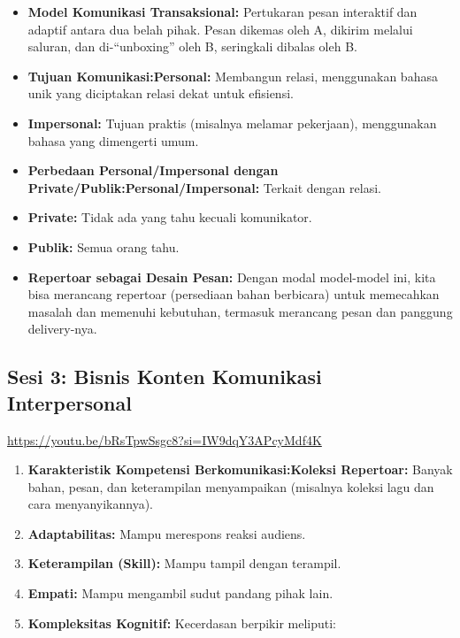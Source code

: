 \documentclass[
  letterpaper,
  DIV=11,
  numbers=noendperiod]{scrreprt}
\providecommand{\tightlist}{%
  \setlength{\itemsep}{0pt}\setlength{\parskip}{0pt}}
\begin{document}
\begin{itemize}
\tightlist
\item
  \textbf{Model Komunikasi Transaksional:} Pertukaran pesan interaktif
  dan adaptif antara dua belah pihak. Pesan dikemas oleh A, dikirim
  melalui saluran, dan di-``unboxing'' oleh B, seringkali dibalas oleh
  B.
\item
  \textbf{Tujuan Komunikasi:Personal:} Membangun relasi, menggunakan
  bahasa unik yang diciptakan relasi dekat untuk efisiensi.
\item
  \textbf{Impersonal:} Tujuan praktis (misalnya melamar pekerjaan),
  menggunakan bahasa yang dimengerti umum.
\item
  \textbf{Perbedaan Personal/Impersonal dengan
  Private/Publik:Personal/Impersonal:} Terkait dengan relasi.
\item
  \textbf{Private:} Tidak ada yang tahu kecuali komunikator.
\item
  \textbf{Publik:} Semua orang tahu.
\item
  \textbf{Repertoar sebagai Desain Pesan:} Dengan modal model-model ini,
  kita bisa merancang repertoar (persediaan bahan berbicara) untuk
  memecahkan masalah dan memenuhi kebutuhan, termasuk merancang pesan
  dan panggung delivery-nya.
\end{itemize}

\subsection{Sesi 3: Bisnis Konten Komunikasi
Interpersonal}\label{sesi-3-bisnis-konten-komunikasi-interpersonal}

\url{https://youtu.be/bRsTpwSsgc8?si=IW9dqY3APcyMdf4K}

\begin{enumerate}
\def\labelenumi{\arabic{enumi}.}
\tightlist
\item
  \textbf{Karakteristik Kompetensi Berkomunikasi:Koleksi Repertoar:}
  Banyak bahan, pesan, dan keterampilan menyampaikan (misalnya koleksi
  lagu dan cara menyanyikannya).
\item
  \textbf{Adaptabilitas:} Mampu merespons reaksi audiens.
\item
  \textbf{Keterampilan (Skill):} Mampu tampil dengan terampil.
\item
  \textbf{Empati:} Mampu mengambil sudut pandang pihak lain.
\item
  \textbf{Kompleksitas Kognitif:} Kecerdasan berpikir meliputi:
\end{enumerate}
\end{document}
